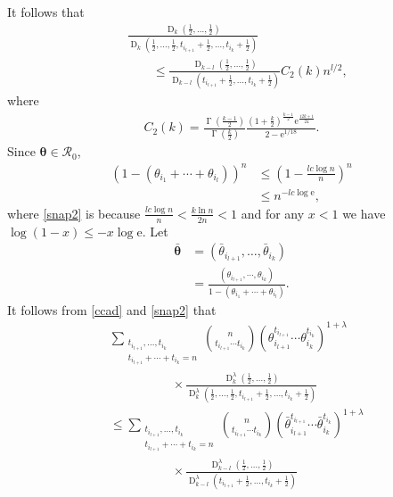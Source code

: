 \documentclass[journal, 10pt]{IEEEtran}
\newcommand{\rme}{\mathrm{e}}
\newcommand{\cR}{\mathcal{R}}
\theoremstyle{plain}
\theoremstyle{plain}
\theoremstyle{plain}
\theoremstyle{plain}
\newcommand{\boldtheta}{\mathbold{\theta}}
\newcommand{\opD}{\operatorname{D}}
\newcommand{\opGamma}{\operatorname{\Gamma}}
\begin{document}
\begin{appendices}
\begin{IEEEproof}
It follows that
\begin{align}
 & \frac{\opD_k(\frac12, \ldots, \frac12) }{{\opD_k(\frac12, \hdots, \frac12, t_{i_{l+1}}+\frac12, \ldots ,t_{i_k}+\frac12)}} \nonumber \\ 
&\qquad \le \frac{\opD_{k-l}(\frac12, \hdots, \frac12)}{\opD_{k-l}(t_{i_{l+1}}+\frac12, \hdots, t_{i_k}+\frac12)} 
C_2(k) n^{ l/2}\text{,} \label{ccad}
\end{align}
where
\begin{align}
C_2(k)= \frac{\opGamma(\frac{k-1}{2})}{ \opGamma(\frac{k}{2})}  
\frac{ (1+\frac{k}{2})^{\frac{k-1}{2}} \rme^{\frac{12k+1}{24}}}
{ 2-\rme^{1/18}} \text{.} \label{eqn:C_2}
\end{align}
Since $\boldtheta \in \cR_0$,
\begin{align}
(1-(\theta_{i_1}+\cdots + \theta_{i_l}))^n &\le 	\left(1-\frac{lc\log n}{n}\right)^{n}  \label{snap1} \\
&\le 
n^{-lc\log \rme}\text{,} \label{snap2} 
\end{align} 
where \eqref{snap2} is because $\frac{lc\log n}{n}	< \frac{k \ln n }{2n} < 1$ and for any $x<1$ we have $\log (1-x)\le -x\log \rme$. Let
\begin{align}
\bar{\boldtheta}&=\left(\bar{\theta}_{i_{l+1}}, \hdots, \bar{\theta}_{i_k} \right) \\
&=\frac{\left( \theta_{i_{l+1}}, \cdots,  \theta_{i_k} \right)}{1-(\theta_{i_1}+\cdots + \theta_{i_l})} \text{.} \label{eqn:bar_theta}
\end{align}
It follows from \eqref{ccad} and \eqref{snap2} that
\begin{align}
&\sum_{\substack{t_{i_{l+1}},\hdots, t_{i_k} \\ t_{i_{l+1}}+\cdots+t_{i_k}=n }}  \binom{n}{t_{i_{l+1}}\cdots t_{i_k}}\left( \theta_{i_{l+1}}^{t_{i_{l+1}}} \cdots \theta_{i_k}^{t_{i_k}} \right)^{1+\lambda} \nonumber \\
&\qquad \qquad \quad \times \frac{\opD^{\lambda}_k\left(\frac12, \ldots, \frac12\right) }{{\opD^{\lambda}_k\left(\frac12, \hdots, \frac12, t_{i_{l+1}}+\frac12, \ldots ,t_{i_k}+\frac12\right)}} \nonumber  \\
&\le
\sum_{\substack{t_{i_{l+1}},\hdots, t_{i_k} \\ t_{i_{l+1}}+\cdots+t_{i_k}=n }}  \binom{n}{t_{i_{l+1}}\cdots t_{i_k}}\left(\bar{\theta}_{i_{l+1}}^{t_{i_{l+1}}} \cdots \bar{\theta}_{i_k}^{t_{i_k}} \right)^{1+\lambda} \label{cdaa}\\
& \qquad \qquad \quad \times \frac{\opD^\lambda_{k-l}(\frac12, \hdots, \frac12)}{\opD^\lambda_{k-l}(t_{i_{l+1}}+\frac12, \hdots, t_{i_k}+\frac12)}

\end{align}
\end{IEEEproof}
\end{appendices}
\end{document}
